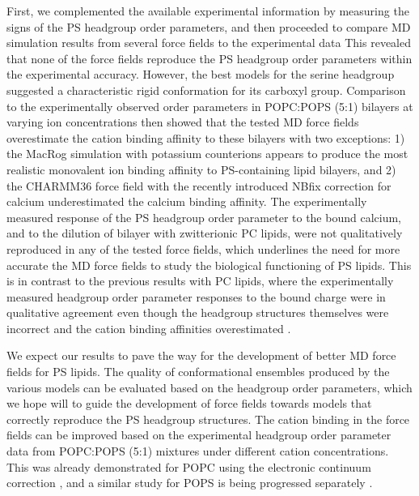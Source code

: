 \documentclass[aps,prl,superscriptaddress,twocolumn]{revtex4}
\begin{document}
First, we complemented the available experimental information \cite{browning80,roux90} by measuring the signs of the PS headgroup order parameters,
and then proceeded to compare MD simulation results from several force fields to the experimental data
This revealed that none of the force fields
reproduce the PS headgroup order parameters within the experimental accuracy. However,
the best models for the serine headgroup suggested a characteristic rigid conformation for its
carboxyl group. Comparison to the experimentally observed order parameters in POPC:POPS (5:1) bilayers  at varying ion
concentrations \cite{roux90} then showed that the tested MD force fields
overestimate the cation binding affinity to these bilayers with two exceptions: 1) the MacRog simulation with potassium counterions appears to produce the most realistic monovalent ion binding
affinity to PS-containing lipid bilayers, and 2) the CHARMM36 force field with the recently introduced
NBfix correction for calcium \cite{kim16} underestimated the calcium binding affinity.
The experimentally measured response of the PS headgroup order parameter to the bound calcium, and to the dilution of bilayer with zwitterionic PC lipids, were not
qualitatively reproduced in any of the tested force fields, which underlines the need for more accurate
the MD force fields to study the biological functioning of PS lipids.
This is in contrast to the previous results with PC lipids,
where the experimentally measured headgroup order parameter responses to the bound charge
were in qualitative agreement even though the headgroup structures themselves were
incorrect and the cation binding affinities overestimated \cite{catte16}.

We expect our results to pave the way for the development of better MD force fields
for PS lipids. The quality of conformational ensembles produced by the various models can be evaluated based on the headgroup order parameters, which we hope will to guide the development of force fields towards models that correctly reproduce the PS headgroup structures. The cation binding in the force fields can be improved based on the experimental headgroup order parameter data from POPC:POPS (5:1) mixtures under different cation concentrations. This was already demonstrated for POPC using the electronic continuum correction \cite{melcr18}, and a
similar study for POPS is being progressed separately \cite{ECCpops}.


%
\end{document}
